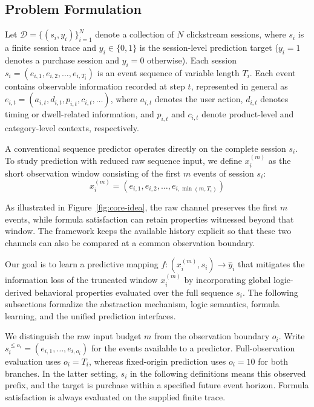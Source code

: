 \documentclass[sigconf,anonymous,nonacm]{acmart}
\newif\ifrevisions
\newcommand{\rev}[1]{\ifrevisions\textcolor{red}{#1}\else#1\fi}
\begin{document}
\subsection{Problem Formulation}\label{sec:problem_formulation}
Let $\mathcal{D}=\{(s_i,y_i)\}_{i=1}^{N}$ denote a collection of $N$ clickstream sessions, where $s_i$ is a finite session trace and $y_i \in \{0,1\}$ is the session-level prediction target ($y_i=1$ denotes a purchase session and $y_i=0$ otherwise). Each session $s_i=(e_{i,1},e_{i,2},\dots,e_{i,T_i})$ is an event sequence of variable length $T_i$. Each event contains observable information recorded at step $t$, represented in general as $e_{i,t}=(a_{i,t},d_{i,t},p_{i,t},c_{i,t},\dots)$, where $a_{i,t}$ denotes the user action, $d_{i,t}$ denotes timing or dwell-related information, and $p_{i,t}$ and $c_{i,t}$ denote product-level and category-level contexts, respectively.

A conventional sequence predictor operates directly on the complete session $s_i$. To study prediction with reduced raw sequence input, we define $x_i^{(m)}$ as the short observation window consisting of the first $m$ events of session $s_i$:
\begin{equation}
    x_i^{(m)} = (e_{i,1}, e_{i,2}, \dots, e_{i,\min(m, T_i)})
\end{equation}

\rev{As illustrated in Figure~\ref{fig:core-idea}, the raw channel preserves the first $m$ events, while formula satisfaction can retain properties witnessed beyond that window. The framework keeps the available history explicit so that these two channels can also be compared at a common observation boundary.}

Our goal is to learn a predictive mapping $f: (x_i^{(m)}, s_i) \to \hat{y}_i$ that mitigates the information loss of the truncated window $x_i^{(m)}$ by incorporating global logic-derived behavioral properties evaluated over the full sequence $s_i$. The following subsections formalize the abstraction mechanism, logic semantics, formula learning, and the unified prediction interfaces.




\rev{We distinguish the raw input budget $m$ from the observation boundary $o_i$. Write $s_i^{\leq o_i}=(e_{i,1},\ldots,e_{i,o_i})$ for the events available to a predictor. Full-observation evaluation uses $o_i=T_i$, whereas fixed-origin prediction uses $o_i=10$ for both branches. In the latter setting, $s_i$ in the following definitions means this observed prefix, and the target is purchase within a specified future event horizon. Formula satisfaction is always evaluated on the supplied finite trace.}
\end{document}
